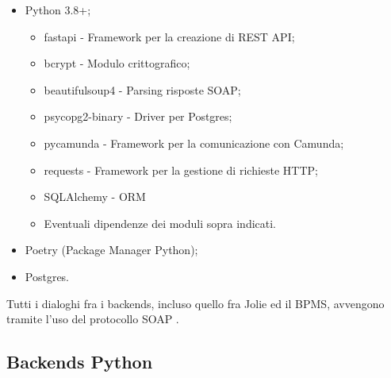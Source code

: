 \documentclass[11pt]{article} %
\begin{document}
\begin{itemize}
\item Python 3.8+;
\begin{itemize}
\item fastapi - Framework per la creazione di REST API;
\item bcrypt - Modulo crittografico;
\item beautifulsoup4 - Parsing risposte SOAP;
\item psycopg2-binary - Driver per Postgres;
\item pycamunda - Framework per la comunicazione con Camunda;
\item requests - Framework per la gestione di richieste HTTP;
\item SQLAlchemy - ORM
\item Eventuali dipendenze dei moduli sopra indicati.
\end{itemize}
\item Poetry (Package Manager Python);
\item Postgres.
\end{itemize}
Tutti i dialoghi fra i backends, incluso quello fra Jolie ed il BPMS, avvengono tramite l'uso del protocollo SOAP .

\subsection{Backends Python}
\end{document}
